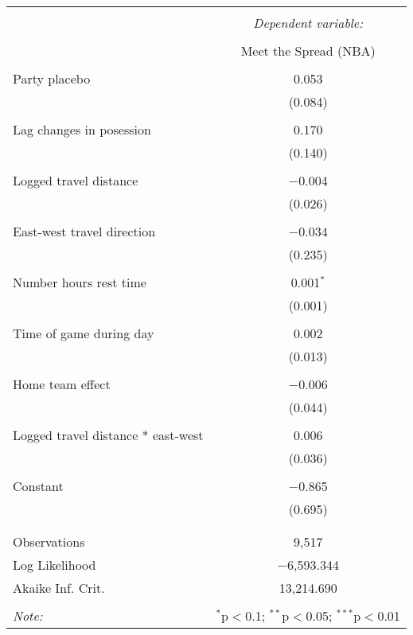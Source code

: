 \documentclass[letterpaper,12pt]{article}
\begin{document}
\begin{tabular}{@{\extracolsep{5pt}}lc}  \\[-1.8ex]\hline  \hline \\[-1.8ex]   & \multicolumn{1}{c}{\textit{Dependent variable:}} \\  \cline{2-2}  \\[-1.8ex] & Meet the Spread (NBA) \\  \hline \\[-1.8ex]   Party placebo & 0.053 \\    & (0.084) \\    & \\   Lag changes in posession & 0.170 \\    & (0.140) \\    & \\   Logged travel distance & $-$0.004 \\    & (0.026) \\    & \\   East-west travel direction & $-$0.034 \\    & (0.235) \\    & \\   Number hours rest time & 0.001$^{*}$ \\    & (0.001) \\    & \\   Time of game during day & 0.002 \\    & (0.013) \\    & \\   Home team effect & $-$0.006 \\    & (0.044) \\    & \\   Logged travel distance * east-west & 0.006 \\    & (0.036) \\    & \\   Constant & $-$0.865 \\    & (0.695) \\    & \\  \hline \\[-1.8ex]  Observations & 9,517 \\  Log Likelihood & $-$6,593.344 \\  Akaike Inf. Crit. & 13,214.690 \\  \hline  \hline \\[-1.8ex]  \textit{Note:}  & \multicolumn{1}{r}{$^{*}$p$<$0.1; $^{**}$p$<$0.05; $^{***}$p$<$0.01} \\  \end{tabular}  
\end{document}
